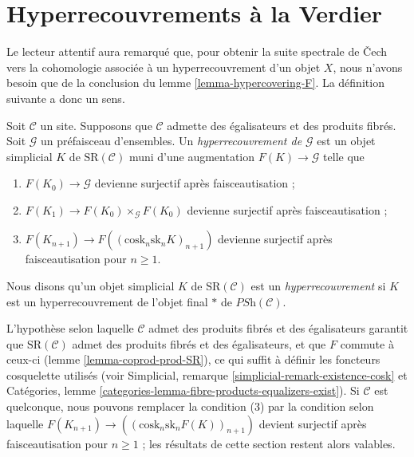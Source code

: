 \section{Hyperrecouvrements à la Verdier}
\label{section-hypercoverings-verdier}

\noindent
Le lecteur attentif aura remarqué que, pour obtenir la suite spectrale
de {\v C}ech vers la cohomologie associée à un hyperrecouvrement d'un objet $X$,
nous n'avons besoin que de la
conclusion du lemme \ref{lemma-hypercovering-F}.
La définition suivante a donc un sens.

\begin{definition}
\label{definition-hypercovering-variant}
Soit $\mathcal{C}$ un site. Supposons que $\mathcal{C}$ admette des égalisateurs
et des produits fibrés. Soit $\mathcal{G}$ un préfaisceau d'ensembles.
Un {\it hyperrecouvrement de $\mathcal{G}$} est un objet simplicial
$K$ de $\text{SR}(\mathcal{C})$ muni d'une augmentation
$F(K) \to \mathcal{G}$ telle que
\begin{enumerate}
\item $F(K_0) \to \mathcal{G}$ devienne surjectif
après faisceautisation ;
\item $F(K_1) \to F(K_0) \times_\mathcal{G} F(K_0)$
devienne surjectif après faisceautisation ;
\item $F(K_{n + 1}) \longrightarrow F((\text{cosk}_n \text{sk}_n K)_{n + 1})$
devienne surjectif après faisceautisation pour $n \geq 1$.
\end{enumerate}
Nous disons qu'un objet simplicial $K$ de $\text{SR}(\mathcal{C})$
est un {\it hyperrecouvrement} si $K$ est un hyperrecouvrement de l'objet
final $*$ de $\textit{PSh}(\mathcal{C})$.
\end{definition}

\noindent
L'hypothèse selon laquelle $\mathcal{C}$ admet des produits fibrés et des égalisateurs
garantit que $\text{SR}(\mathcal{C})$ admet des produits fibrés
et des égalisateurs, et que $F$ commute à ceux-ci
(lemme \ref{lemma-coprod-prod-SR}), ce qui suffit
à définir les foncteurs cosquelette utilisés (voir
Simplicial, remarque \ref{simplicial-remark-existence-cosk} et
Catégories, lemme \ref{categories-lemma-fibre-products-equalizers-exist}).
Si $\mathcal{C}$ est quelconque, nous pouvons remplacer la condition (3) par la
condition selon laquelle
$F(K_{n + 1}) \longrightarrow ((\text{cosk}_n \text{sk}_n F(K))_{n + 1})$
devient surjectif après faisceautisation pour $n \geq 1$ ; les
résultats de cette section restent alors valables.

